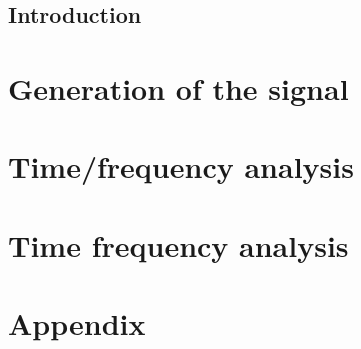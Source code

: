 \documentclass[12pt,fleqn]{report} %
\begin{document}
\renewcommand{\contentsname}{Contents}                %
\renewcommand{\bibname}{Bibliography}  %



\tableofcontents  %
\cleardoublepage  %

\chapter{Introduction}


\part{Generation of the signal}


\part{Time/frequency analysis}



\part{Time frequency analysis}





\appendix
\part{Appendix}



%




\end{document}
